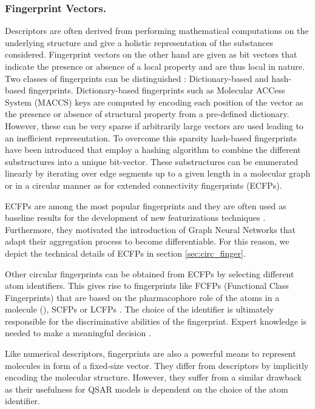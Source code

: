 \subsubsection*{Fingerprint Vectors.}
Descriptors are often derived from performing mathematical computations on the underlying structure and give a holistic representation of the substances considered. Fingerprint vectors on the other hand are given as bit vectors that indicate the presence or absence of a local property and are thus local in nature. Two classes of fingerprints can be distinguished \citep{SHEN201929}: Dictionary-based and hash-based fingerprints. Dictionary-based fingerprints such as Molecular ACCess System (MACCS) keys \citep{durant2002reoptimization} are computed by encoding each position of the vector as the presence or absence of structural property from a pre-defined dictionary. However, these can be very sparse if arbitrarily large vectors are used leading to an inefficient representation. To overcome this sparsity hash-based fingerprints have been introduced that employ a hashing algorithm to combine the different substructures into a unique bit-vector. These substructures can be enumerated linearly by iterating over edge segments up to a given length in a molecular graph \citep{daylight} or in a circular manner as for extended connectivity fingerprints (ECFPs). 

ECFPs \citep{ECFP} are among the most popular fingerprints and they are often used as baseline results for the development of new featurizations techniques \citep{li2017learning, wu2018moleculenet, STOKES2020688}. Furthermore, they motivated the introduction of Graph Neural Networks that adapt their aggregation process to become differentiable. For this reason, we depict the technical details of ECFPs in section \ref{sec:circ_finger}.

Other circular fingerprints can be obtained from ECFPs by selecting different atom identifiers. This gives rise to fingerprints like FCFPs (Functional Class Fingerprints) that are based on the pharmacophore role of the atoms in a molecule (\cite{ECFP}), SCFPs \citep{SCFP} or LCFPs \citep{LCFP}. The choice of the identifier is ultimately responsible for the discriminative abilities of the fingerprint. Expert knowledge is needed to make a meaningful decision \citep{WIEDER2020}.

Like numerical descriptors, fingerprints are also a powerful means to represent molecules in form of a fixed-size vector. They differ from descriptors by implicitly encoding the molecular structure. However, they suffer from a similar drawback as their usefulness for QSAR models is dependent on the choice of the atom identifier.


